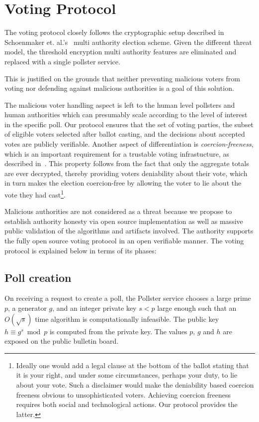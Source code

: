 
\section{Voting Protocol}

The voting protocol closely follows the cryptographic
setup described in Schoenmaker et. al.'s~\cite{Cramer:1997:SOE:1754542.1754554}
multi authority election scheme.  Given the different threat model,
the threshold encryption multi authority features are eliminated
and replaced with a single pollster service.


This is justified on the grounds that neither preventing malicious voters from
voting nor defending against malicious authorities is a
goal of this solution.

The malicious voter handling aspect is left to the human level pollsters
and human authorities which can presumably scale according to the level
of interest in the specific poll.
Our protocol ensures that the set of voting parties, the subset of eligible
voters selected after ballot casting, and the decisions about
accepted votes are publicly verifiable.
Another aspect of differentiation is \emph{coercion-freeness}, which
is an important requirement for a trustable voting infrastucture,
as described in~\cite{Karlof:2005:CVP:1251398.1251401}.
This property follows from the fact that only the aggregate totals are ever
decrypted, thereby providing voters deniability about their vote,
which in turn makes the
election coercion-free by allowing the voter to lie about the vote
they had cast\footnote{Ideally one would add a legal clause at the bottom of the
  ballot stating that it is your right, and under some circumstances,
  perhaps your duty, to lie about your vote. Such a disclaimer
  would make the deniability based coercion freeness obvious to
  unsophisticated voters.  Achieving coercion freeness requires both social and
  technological actions.  Our protocol provides the latter.}.

Malicious authorities are not considered as a threat because we
propose to establish authority honesty via open source implementation as well
as massive public validation of the algorithms and artifacts involved.
The authority supports the fully open source voting protocol in an
open verifiable manner.  The voting protocol is explained below in terms of
its phases:

\subsection{Poll creation}
On receiving a request to create a poll, the Pollster service
chooses a large prime $p$, a generator $g$, and an integer private key $s < p$
large enough such that an $O(\sqrt s)$ time algorithm is computationally
infeasible.
The public key $h \equiv g^s\bmod p$ is computed from the private key.
The values $p$, $g$ and $h$
are exposed on the public bulletin board.

